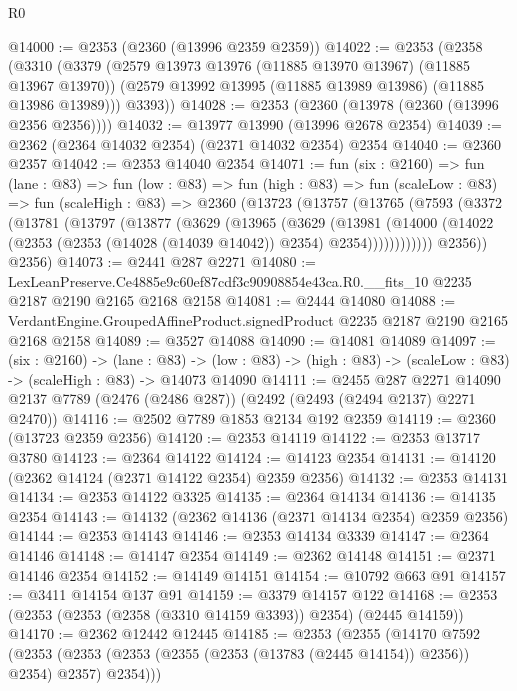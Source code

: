 \begin{lexlean}{R0}
\begin{coremodule}
@14000 := @2353 (@2360 (@13996 @2359 @2359))
@14022 := @2353
    (@2358
      (@3310
        (@3379
          (@2579 @13973 @13976 (@11885 @13970 @13967) (@11885 @13967 @13970))
          (@2579 @13992 @13995 (@11885 @13989 @13986) (@11885 @13986 @13989)))
        @3393))
@14028 := @2353 (@2360 (@13978 (@2360 (@13996 @2356 @2356))))
@14032 := @13977 @13990 (@13996 @2678 @2354)
@14039 := @2362 (@2364 @14032 @2354) (@2371 @14032 @2354) @2354
@14040 := @2360 @2357
@14042 := @2353 @14040 @2354
@14071 := fun (six : @2160) =>
  fun (lane : @83) =>
  fun (low : @83) =>
  fun (high : @83) =>
  fun (scaleLow : @83) =>
  fun (scaleHigh : @83) =>
  @2360
    (@13723
      (@13757
        (@13765
          (@7593
            (@3372
              (@13781
                (@13797
                  (@13877
                    (@3629
                      (@13965
                        (@3629
                          (@13981
                            (@14000
                              (@14022
                                (@2353 (@2353 (@14028 (@14039 @14042)) @2354) @2354))))))))))))
          @2356))
      @2356)
@14073 := @2441 @287 @2271
@14080 := LexLeanPreserve.Ce4885e9c60ef87cdf3c90908854e43ca.R0.__fits_10
    @2235
    @2187
    @2190
    @2165
    @2168
    @2158
@14081 := @2444 @14080
@14088 := VerdantEngine.GroupedAffineProduct.signedProduct @2235 @2187 @2190 @2165 @2168 @2158
@14089 := @3527 @14088
@14090 := @14081 @14089
@14097 := (six : @2160) ->
  (lane : @83) ->
  (low : @83) -> (high : @83) -> (scaleLow : @83) -> (scaleHigh : @83) -> @14073 @14090
@14111 := @2455
    @287
    @2271
    @14090
    @2137
    @7789
    (@2476 (@2486 @287))
    (@2492 (@2493 (@2494 @2137) @2271 @2470))
@14116 := @2502 @7789 @1853 @2134 @192 @2359
@14119 := @2360 (@13723 @2359 @2356)
@14120 := @2353 @14119
@14122 := @2353 @13717 @3780
@14123 := @2364 @14122
@14124 := @14123 @2354
@14131 := @14120 (@2362 @14124 (@2371 @14122 @2354) @2359 @2356)
@14132 := @2353 @14131
@14134 := @2353 @14122 @3325
@14135 := @2364 @14134
@14136 := @14135 @2354
@14143 := @14132 (@2362 @14136 (@2371 @14134 @2354) @2359 @2356)
@14144 := @2353 @14143
@14146 := @2353 @14134 @3339
@14147 := @2364 @14146
@14148 := @14147 @2354
@14149 := @2362 @14148
@14151 := @2371 @14146 @2354
@14152 := @14149 @14151
@14154 := @10792 @663 @91
@14157 := @3411 @14154 @137 @91
@14159 := @3379 @14157 @122
@14168 := @2353 (@2353 (@2353 (@2358 (@3310 @14159 @3393)) @2354) (@2445 @14159))
@14170 := @2362 @12442 @12445
@14185 := @2353
    (@2355
      (@14170
        @7592
        (@2353 (@2353 (@2353 (@2355 (@2353 (@13783 (@2445 @14154)) @2356)) @2354) @2357) @2354)))

\end{coremodule}
\end{lexlean}
